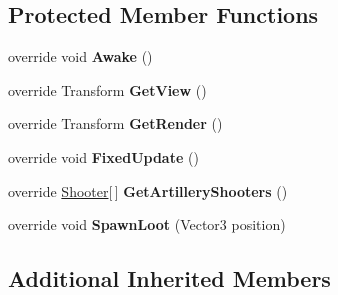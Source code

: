 \subsection*{Protected Member Functions}
\begin{DoxyCompactItemize}
\item 
\hypertarget{class_skyrates_1_1_client_1_1_entity_player_ship_a9db8469e2b7854e16ce162a6f3764faa}{override void {\bfseries Awake} ()}\label{class_skyrates_1_1_client_1_1_entity_player_ship_a9db8469e2b7854e16ce162a6f3764faa}

\item 
\hypertarget{class_skyrates_1_1_client_1_1_entity_player_ship_a6f8eabb948e3acf794bd6c230980b0e3}{override Transform {\bfseries Get\-View} ()}\label{class_skyrates_1_1_client_1_1_entity_player_ship_a6f8eabb948e3acf794bd6c230980b0e3}

\item 
\hypertarget{class_skyrates_1_1_client_1_1_entity_player_ship_a7550d6b6cabb315bc4df868dde129f23}{override Transform {\bfseries Get\-Render} ()}\label{class_skyrates_1_1_client_1_1_entity_player_ship_a7550d6b6cabb315bc4df868dde129f23}

\item 
\hypertarget{class_skyrates_1_1_client_1_1_entity_player_ship_a998fa020992060cd89761997097ae686}{override void {\bfseries Fixed\-Update} ()}\label{class_skyrates_1_1_client_1_1_entity_player_ship_a998fa020992060cd89761997097ae686}

\item 
\hypertarget{class_skyrates_1_1_client_1_1_entity_player_ship_afabe8f9811c8be14f2e746ab1f44874b}{override \hyperlink{class_shooter}{Shooter}\mbox{[}$\,$\mbox{]} {\bfseries Get\-Artillery\-Shooters} ()}\label{class_skyrates_1_1_client_1_1_entity_player_ship_afabe8f9811c8be14f2e746ab1f44874b}

\item 
\hypertarget{class_skyrates_1_1_client_1_1_entity_player_ship_af4fafbed973c7222d02e1df485d9ad73}{override void {\bfseries Spawn\-Loot} (Vector3 position)}\label{class_skyrates_1_1_client_1_1_entity_player_ship_af4fafbed973c7222d02e1df485d9ad73}

\end{DoxyCompactItemize}
\subsection*{Additional Inherited Members}


